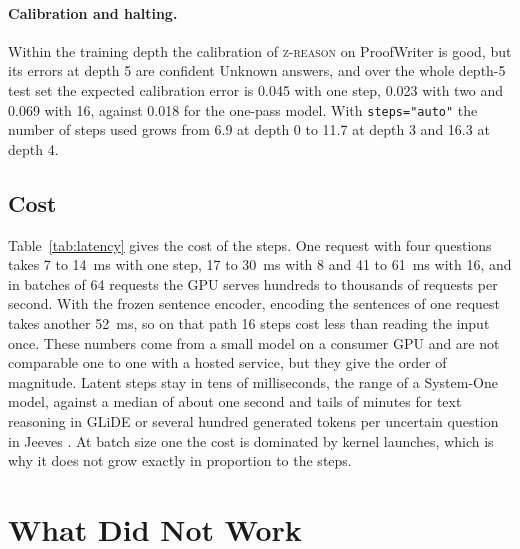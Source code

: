 \documentclass{article}
\newcommand{\zr}{\textsc{z-reason}}
\begin{document}
\paragraph{Calibration and halting.} Within the training depth the calibration of \zr{} on ProofWriter is good, but its errors at depth 5 are confident Unknown answers, and over the whole depth-5 test set the expected calibration error is 0.045 with one step, 0.023 with two and 0.069 with 16, against 0.018 for the one-pass model. With \texttt{steps="auto"} the number of steps used grows from 6.9 at depth 0 to 11.7 at depth 3 and 16.3 at depth 4.

\subsection{Cost}

\begin{table}[t]
\centering
\small
\caption{Wall-clock cost of the latent steps on one RTX~3060, for requests of one state with four questions, measured after warm-up with bfloat16 autocast. For variable tracking the vectors of the frozen sentence encoder are computed beforehand, and computing them for one request takes a further 52~ms.}
\label{tab:latency}
\resizebox{\textwidth}{!}{}
\end{table}

Table~\ref{tab:latency} gives the cost of the steps. One request with four questions takes 7 to 14~ms with one step, 17 to 30~ms with 8 and 41 to 61~ms with 16, and in batches of 64 requests the GPU serves hundreds to thousands of requests per second. With the frozen sentence encoder, encoding the sentences of one request takes another 52~ms, so on that path 16 steps cost less than reading the input once. These numbers come from a small model on a consumer GPU and are not comparable one to one with a hosted service, but they give the order of magnitude. Latent steps stay in tens of milliseconds, the range of a System-One model, against a median of about one second and tails of minutes for text reasoning in GLiDE \cite{anthus2026glide} or several hundred generated tokens per uncertain question in Jeeves \cite{posthog2026jeeves}. At batch size one the cost is dominated by kernel launches, which is why it does not grow exactly in proportion to the steps.

\section{What Did Not Work}
\label{sec:lessons}
\end{document}
